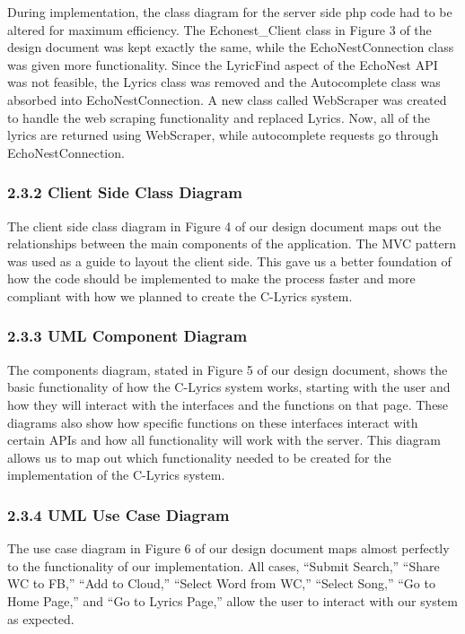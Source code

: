 \documentclass[]{article}
\begin{document}
During implementation, the class diagram for the server side php code
had to be altered for maximum efficiency. The Echonest\_Client class in
Figure 3 of the design document was kept exactly the same, while the
EchoNestConnection class was given more functionality. Since the
LyricFind aspect of the EchoNest API was not feasible, the Lyrics class
was removed and the Autocomplete class was absorbed into
EchoNestConnection. A new class called WebScraper was created to handle
the web scraping functionality and replaced Lyrics. Now, all of the
lyrics are returned using WebScraper, while autocomplete requests go
through EchoNestConnection.

\subsubsection{2.3.2 Client Side Class
Diagram}\label{client-side-class-diagram}

The client side class diagram in Figure 4 of our design document maps
out the relationships between the main components of the application.
The MVC pattern was used as a guide to layout the client side. This gave
us a better foundation of how the code should be implemented to make the
process faster and more compliant with how we planned to create the
C-Lyrics system.

\subsubsection{2.3.3 UML Component
Diagram}\label{uml-component-diagram}

The components diagram, stated in Figure 5 of our design document, shows
the basic functionality of how the C-Lyrics system works, starting with
the user and how they will interact with the interfaces and the
functions on that page. These diagrams also show how specific functions
on these interfaces interact with certain APIs and how all functionality
will work with the server. This diagram allows us to map out which
functionality needed to be created for the implementation of the
C-Lyrics system.

\subsubsection{2.3.4 UML Use Case
Diagram}\label{uml-use-case-diagram}

The use case diagram in Figure 6 of our design document maps almost
perfectly to the functionality of our implementation. All cases,
``Submit Search,'' ``Share WC to FB,'' ``Add to Cloud,'' ``Select Word
from WC,'' ``Select Song,'' ``Go to Home Page,'' and ``Go to Lyrics
Page,'' allow the user to interact with our system as expected.
\end{document}
